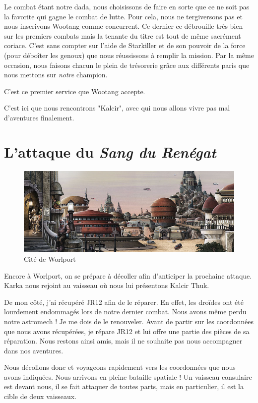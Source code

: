 \documentclass[a4paper,9pt,twoside,twocolumn,openany]{book}
\begin{document}
Le combat étant notre dada, nous choisissons de faire en sorte que ce ne soit pas la favorite qui gagne le combat de lutte. Pour cela, nous ne tergiversons pas et nous inscrivons Wootang comme concurrent.
Ce dernier ce débrouille très bien sur les premiers combats mais la tenante du titre est tout de même sacrément coriace.
C'est sans compter sur l'aide de Starkiller et de son pouvoir de la force (pour déboîter les genoux) que nous réussissons à remplir la mission.
Par la même occasion, nous faisons chacun le plein de trésorerie grâce aux différents paris que nous mettons sur \emph{notre} champion.

C'est ce premier service que Wootang accepte.

C'est ici que nous rencontrons "Kalcir", avec qui nous allons vivre pas mal d'aventures finalement.

\section{L'attaque du \emph{Sang du Renégat}}
\subtitle{18 mars 2018}

\begin{figure}[]
\centering
    \includegraphics[width=.80\textwidth]{img/worlport}
    \caption{Cité de Worlport}
\end{figure}

Encore à Worlport, on se prépare à décoller afin d'anticiper la prochaine attaque. Karka nous rejoint au vaisseau où nous lui présentons Kalcir Thuk.

De mon côté, j'ai récupéré JR12 afin de le réparer. En effet, les droïdes ont été lourdement endommagés lors de notre dernier combat. Nous avons même perdu notre astromech ! Je me dois de le renouveler. Avant de partir sur les coordonnées que nous avons récupérées, je répare JR12 et lui offre une partie des pièces de sa réparation. Nous restons ainsi amis, mais il ne souhaite pas nous accompagner dans nos aventures.

Nous décollons donc et voyageons rapidement vers les coordonnées que nous avons indiquées. Nous arrivons en pleine bataille spatiale ! Un vaisseau consulaire est devant nous, il se fait attaquer de toutes parts, mais en particulier, il est la cible de deux vaisseaux.
\end{document}
